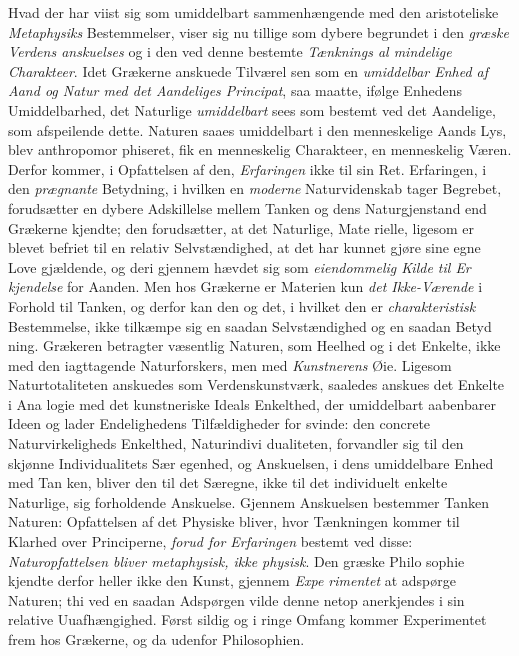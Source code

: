 Hvad der har viist sig som umiddelbart sammenhængende
med den aristoteliske \emph{Metaphysiks} Bestemmelser, viser sig
nu tillige som dybere begrundet i den \emph{græske Verdens\-%
anskuelses} og i den ved denne bestemte \emph{Tænknings al\-%
mindelige Charakteer}. Idet Grækerne anskuede Tilværel\-%
sen som en \emph{umiddelbar Enhed af Aand og Natur med
det Aandeliges Principat}, saa maatte, ifølge Enhedens
Umiddelbarhed, det Naturlige \emph{umiddelbart} sees som bestemt
ved det Aandelige, som afspeilende dette. Naturen saaes
umiddelbart i den menneskelige Aands Lys, blev anthropomor\-%
phiseret, fik en menneskelig Charakteer, en menneskelig Væren.
Derfor kommer, i Opfattelsen af den, \emph{Erfaringen} ikke til
sin Ret. Erfaringen, i den \emph{prægnante} Betydning, i hvilken
en \emph{moderne} Naturvidenskab tager Begrebet, forudsætter en
dybere Adskillelse mellem Tanken og dens Naturgjenstand end
Grækerne kjendte; den forudsætter, at det Naturlige, Mate\-%
rielle, ligesom er blevet befriet til en relativ Selvstændighed,
at det har kunnet gjøre sine egne Love gjældende, og deri\-%
gjennem hævdet sig som \emph{eiendommelig Kilde til Er\-%
kjendelse} for Aanden. Men hos Grækerne er Materien kun
\emph{det Ikke-Værende} i Forhold til Tanken, og derfor kan den
og det, i hvilket den er \emph{charakteristisk} Bestemmelse, ikke
tilkæmpe sig en saadan Selvstændighed og en saadan Betyd\-%
ning. Grækeren betragter væsentlig Naturen, som Heelhed og
i det Enkelte, ikke med den iagttagende Naturforskers, men
med \emph{Kunstnerens} Øie. Ligesom Naturtotaliteten anskuedes
som Verdenskunstværk, saaledes anskues det Enkelte i Ana\-%
logie med det kunstneriske Ideals Enkelthed, der umiddelbart
aabenbarer Ideen og lader Endelighedens Tilfældigheder for\-%
svinde: den concrete Naturvirkeligheds Enkelthed, Naturindivi\-%
dualiteten, forvandler sig til den skjønne Individualitets Sær\-%
egenhed, og Anskuelsen, i dens umiddelbare Enhed med Tan\-%
ken, bliver den til det Særegne, ikke til det individuelt enkelte
Naturlige, sig forholdende Anskuelse. Gjennem Anskuelsen
bestemmer Tanken Naturen: Opfattelsen af det Physiske bliver,
hvor Tænkningen kommer til Klarhed over Principerne, \emph{forud
for Erfaringen} bestemt ved disse: \emph{Naturopfattelsen
bliver metaphysisk, ikke physisk}. Den græske Philo\-%
sophie kjendte derfor heller ikke den Kunst, gjennem \emph{Expe\-%
rimentet} at adspørge Naturen; thi ved en saadan Adspørgen
vilde denne netop anerkjendes i sin relative Uuafhængighed.
Først sildig og i ringe Omfang kommer Experimentet frem
hos Grækerne, og da udenfor Philosophien.

